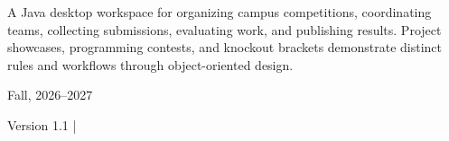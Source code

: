 {\begin{titlepage}
\vspace{0.22cm}{\color{aauRed!55}\rule{0.6\textwidth}{1.2pt}\par}
\vspace{0.3cm}
\begin{tcolorbox}[colback=gray!5,colframe=black!70,title=\textbf{Project Summary},fonttitle=\bfseries,width=0.95\textwidth,boxrule=0.4mm,arc=3mm,left=7pt,right=7pt,top=4pt,bottom=4pt]
A Java desktop workspace for organizing campus competitions, coordinating teams, collecting submissions, evaluating work, and publishing results. Project showcases, programming contests, and knockout brackets demonstrate distinct rules and workflows through object-oriented design.
\end{tcolorbox}
\vfill{\normalsize Fall, 2026--2027\par}{\small Version 1.1 \;|\; \reportdate\par}
\end{titlepage}\hypersetup{pageanchor=true}\tableofcontents\clearpage{}}
